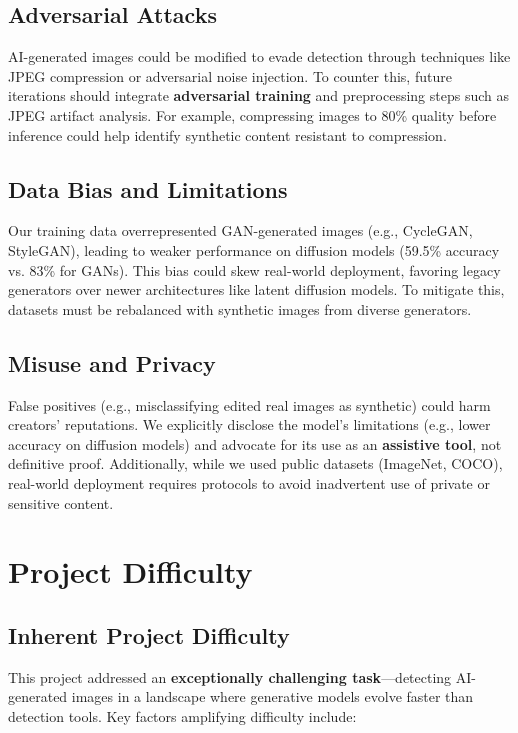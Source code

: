 \documentclass{article} %
\begin{document}
\subsection{Adversarial Attacks}
AI-generated images could be modified to evade detection through techniques like JPEG compression or adversarial noise injection. To counter this, future iterations should integrate \textbf{adversarial training} and preprocessing steps such as JPEG artifact analysis. For example, compressing images to 80\% quality before inference could help identify synthetic content resistant to compression.

\subsection{Data Bias and Limitations}
Our training data overrepresented GAN-generated images (e.g., CycleGAN, StyleGAN), leading to weaker performance on diffusion models (59.5\% accuracy vs. 83\% for GANs). This bias could skew real-world deployment, favoring legacy generators over newer architectures like latent diffusion models. To mitigate this, datasets must be rebalanced with synthetic images from diverse generators.

\subsection{Misuse and Privacy}
False positives (e.g., misclassifying edited real images as synthetic) could harm creators' reputations. We explicitly disclose the model’s limitations (e.g., lower accuracy on diffusion models) and advocate for its use as an \textbf{assistive tool}, not definitive proof. Additionally, while we used public datasets (ImageNet, COCO), real-world deployment requires protocols to avoid inadvertent use of private or sensitive content.


\section{Project Difficulty}

\subsection{Inherent Project Difficulty}  
This project addressed an \textbf{exceptionally challenging task}—detecting AI-generated images in a landscape where generative models evolve faster than detection tools. Key factors amplifying difficulty include:  
\end{document}
